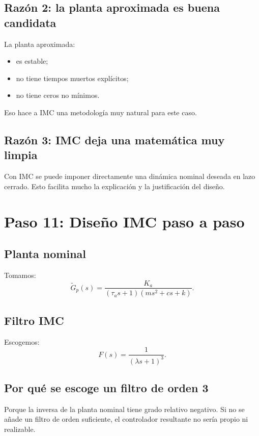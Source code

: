 \documentclass[11pt]{article}
\begin{document}
\subsection{Raz\'on 2: la planta aproximada es buena candidata}

La planta aproximada:

\begin{itemize}[leftmargin=1.2cm]
\item es estable;
\item no tiene tiempos muertos expl\'icitos;
\item no tiene ceros no m\'inimos.
\end{itemize}

Eso hace a IMC una metodolog\'ia muy natural para este caso.

\subsection{Raz\'on 3: IMC deja una matem\'atica muy limpia}

Con IMC se puede imponer directamente una din\'amica nominal deseada en lazo cerrado. Esto facilita mucho la explicaci\'on y la justificaci\'on del dise\~no.

\section{Paso 11: Dise\~no IMC paso a paso}

\subsection{Planta nominal}

Tomamos:
\[
\tilde{G}_p(s)=\frac{K_a}{(\tau_as+1)(ms^2+cs+k)}.
\]

\subsection{Filtro IMC}

Escogemos:
\begin{equation}
F(s)=\frac{1}{(\lambda s+1)^3}.
\label{eq:filtro}
\end{equation}

\subsection{Por qu\'e se escoge un filtro de orden 3}

Porque la inversa de la planta nominal tiene grado relativo negativo. Si no se a\~nade un filtro de orden suficiente, el controlador resultante no ser\'ia propio ni realizable.
\end{document}
